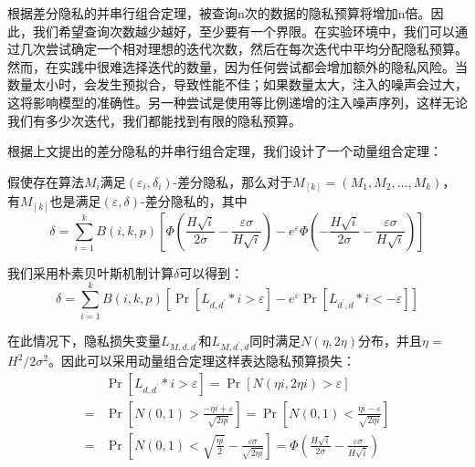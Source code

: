根据差分隐私的并串行组合定理，被查询n次的数据的隐私预算将增加n倍。因此，我们希望查询次数越少越好，至少要有一个界限。在实验环境中，我们可以通过几次尝试确定一个相对理想的迭代次数，然后在每次迭代中平均分配隐私预算。然而，在实践中很难选择迭代的数量，因为任何尝试都会增加额外的隐私风险。当数量太小时，会发生预拟合，导致性能不佳；如果数量太大，注入的噪声会过大，这将影响模型的准确性。另一种尝试是使用等比例递增的注入噪声序列，这样无论我们有多少次迭代，我们都能找到有限的隐私预算。

根据上文提出的差分隐私的并串行组合定理，我们设计了一个动量组合定理：
\begin{theorem}[动量组合定理]\label{动量组合定理}
假使存在算法$M_{i}$满足$\left(\varepsilon_{i}, \delta_{i}\right)$-差分隐私，那么对于$M_{[k]}=\left(M_{1}, M_{2}, \ldots, M_{k}\right)$，有$M_{[k]}$也是满足$(\varepsilon, \delta)$-差分隐私的，其中
$$
\delta=\sum_{i=1}^{k} B(i, k, p)\left[\Phi\left(\frac{H \sqrt{i}}{2 \sigma}-\frac{\varepsilon \sigma}{H \sqrt{i}}\right)-e^{\varepsilon} \Phi\left(-\frac{H \sqrt{i}}{2 \sigma}-\frac{\varepsilon \sigma}{H \sqrt{i}}\right)\right]
$$
\end{theorem}

我们采用朴素贝叶斯机制计算$\delta$可以得到：
\begin{equation}\label{eq:朴素贝叶斯}
\delta=\sum_{i=1}^{k} B(i, k, p)\left[\operatorname{Pr}\left[L_{d, d^{\prime}} * i>\varepsilon\right]-e^{\varepsilon} \operatorname{Pr}\left[L_{d^{\prime}, d} * i<-\varepsilon\right]\right]
\end{equation}

在此情况下，隐私损失变量$L_{M, d, d^{\prime}}$和$L_{M, d^{\prime}, d}$同时满足$N(\eta, 2 \eta)$分布，并且$\eta=$ $H^{2} / 2 \sigma^{2}$。因此可以采用动量组合定理这样表达隐私预算损失：
\begin{equation}\label{eq:隐私预算计算1}
\begin{aligned}
& \operatorname{Pr}\left[L_{d, d^{\prime}} * i>\varepsilon\right]=\operatorname{Pr}[N(\eta i, 2 \eta i)>\varepsilon] \\
=& \operatorname{Pr}\left[N(0,1)>\frac{-\eta i+\varepsilon}{\sqrt{2 \eta i}}\right]=\operatorname{Pr}\left[N(0,1)<\frac{\eta i-\varepsilon}{\sqrt{2 \eta i}}\right] \\
=& \operatorname{Pr}\left[N(0,1)<\sqrt{\frac{\eta i}{2}}-\frac{\varepsilon \sigma}{\sqrt{2 \eta i}}\right]=\Phi\left(\frac{H \sqrt{i}}{2 \sigma}-\frac{\varepsilon \sigma}{H \sqrt{i}}\right)
\end{aligned}
\end{equation}


